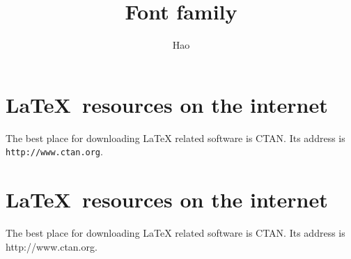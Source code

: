 \documentclass[a4paper,10pt]{article}
\title{Font family}
\author{Hao}
\begin{document}
\maketitle
\section{\textsf{\LaTeX\ resources on the internet}}
The best place for downloading LaTeX related software is CTAN.
Its address is \texttt{http://www.ctan.org}.

\section{\sffamily\LaTeX\ resources on the internet}
The best place for downloading LaTeX related software is CTAN.
Its address is \ttfamily http://www.ctan.org.
\end{document}
